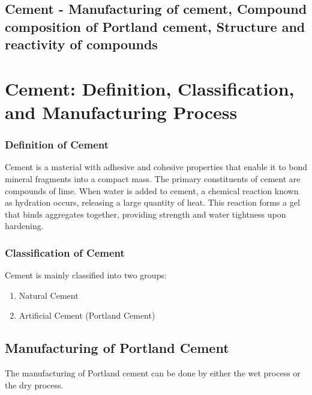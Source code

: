 \documentclass[a4paper,11pt]{book}
\begin{document}
\subsection{Cement - Manufacturing of cement,
Compound composition of Portland cement,
Structure and reactivity of compounds}
\section*{Cement: Definition, Classification, and Manufacturing Process}

\subsubsection{Definition of Cement}
Cement is a material with adhesive and cohesive properties that enable it to bond mineral fragments into a compact mass. The primary constituents of cement are compounds of lime. When water is added to cement, a chemical reaction known as hydration occurs, releasing a large quantity of heat. This reaction forms a gel that binds aggregates together, providing strength and water tightness upon hardening.

\subsubsection*{Classification of Cement}
Cement is mainly classified into two groups:
\begin{enumerate}
    \item Natural Cement
    \item Artificial Cement (Portland Cement)
\end{enumerate}

\subsection*{Manufacturing of Portland Cement}
The manufacturing of Portland cement can be done by either the wet process or the dry process.
\end{document}
